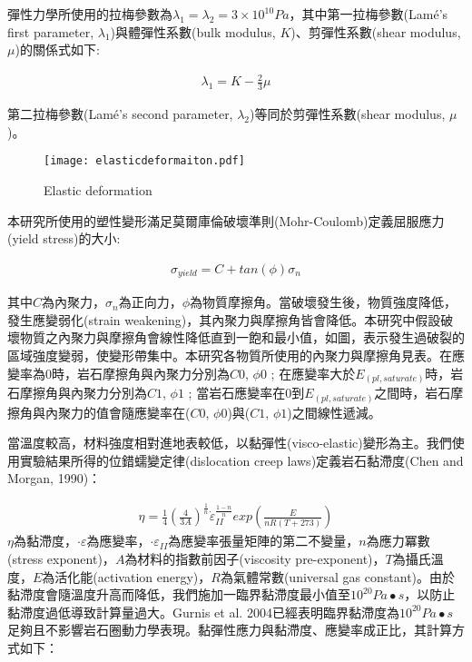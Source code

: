 彈性力學所使用的拉梅參數為$\lambda_1 = \lambda_2 = 3 \times 10^{10} Pa$，其中第一拉梅參數(Lamé's first parameter, $\lambda_1$)與體彈性系數(bulk modulus, $K$)、剪彈性系數(shear modulus, $\mu$)的關係式如下:

\begin{align}
\lambda_1 = K - \frac{2}{3}\mu
\end{align}

第二拉梅參數(Lamé's second parameter, $\lambda_2$)等同於剪彈性系數(shear modulus, $\mu$)。

\begin{figure*}[ht!]
    \centering
    \texttt{[image: elasticdeformaiton.pdf]}
    \caption{ Elastic deformation }
    \label{fig::elastic}
\end{figure*}

本研究所使用的塑性變形滿足莫爾庫倫破壞準則(Mohr-Coulomb)定義屈服應力(yield stress)的大小:

\begin{align}
    \sigma_{yield}=C+tan(\phi)\sigma_{n}\label{eqn:elastic tensor}
\end{align}

其中$C$為內聚力，$\sigma_n$為正向力，$\phi$為物質摩擦角。當破壞發生後，物質強度降低，發生應變弱化(strain weakening)，其內聚力與摩擦角皆會降低。本研究中假設破壞物質之內聚力與摩擦角會線性降低直到一飽和最小值，如圖，表示發生過破裂的區域強度變弱，使變形帶集中。本研究各物質所使用的內聚力與摩擦角見表。在應變率為$0$時，岩石摩擦角與內聚力分別為$C0$, $\phi0$ ; 在應變率大於$E_(pl,saturate)$時，岩石摩擦角與內聚力分別為$C1$, $\phi1$ ; 當岩石應變率在0到$E_(pl,saturate)$之間時，岩石摩擦角與內聚力的值會隨應變率在($C0$, $\phi0$)與($C1$, $\phi1$)之間線性遞減。


當溫度較高，材料強度相對進地表較低，以黏彈性(visco-elastic)變形為主。我們使用實驗結果所得的位錯蠕變定律(dislocation creep laws)定義岩石黏滯度(Chen and Morgan, 1990)：

\begin{align}
   \eta=\frac{1}{4}(\frac{4}{3A})^{\frac{1}{n}} \dot\varepsilon_{II}^{\frac{1-n}{n}} exp(\frac{E}{nR(T+273)})
   \label{eqn:viscousity}
\end{align}
$\eta$為黏滯度，$\cdot\varepsilon$為應變率，$\cdot\varepsilon_{II}$為應變率張量矩陣的第二不變量，$n$為應力冪數(stress exponent)，$A$為材料的指數前因子(viscosity pre-exponent)，$T$為攝氏溫度，$E$為活化能(activation energy)，$R$為氣體常數(universal gas constant)。由於黏滯度會隨溫度升高而降低，我們施加一臨界黏滯度最小值至$10^20 Pa∙s$，以防止黏滯度過低導致計算量過大。Gurnis et al. 2004已經表明臨界黏滯度為$10^20 Pa∙s$足夠且不影響岩石圈動力學表現。黏彈性應力與黏滯度、應變率成正比，其計算方式如下：	

